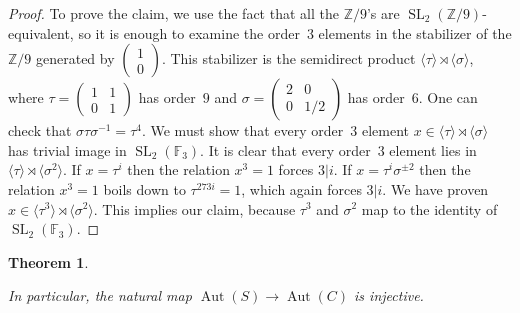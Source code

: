 \documentclass[11pt]{article}
\makeatletter
\newtheorem{theo}{Theorem}[section]
\theoremstyle{definition}
\numberwithin{equation}{section}
\numberwithin{figure}{section}
\numberwithin{table}{section}
\let\save@mathaccent\mathaccent
\newcommand*\if@single[3]{%
  \setbox0\hbox{${\mathaccent"0362{#1}}^H$}%
  \setbox2\hbox{${\mathaccent"0362{\kern0pt#1}}^H$}%
  \ifdim\ht0=\ht2 #3\else #2\fi
  }
\newcommand*\rel@kern[1]{\kern#1\dimexpr\macc@kerna}
\newcommand*\widebar[1]{\@ifnextchar^{{\wide@bar{#1}{0}}}{\wide@bar{#1}{1}}}
\newcommand*\wide@bar[2]{\if@single{#1}{\wide@bar@{#1}{#2}{1}}{\wide@bar@{#1}{#2}{2}}}
\newcommand*\wide@bar@[3]{%
  \begingroup
  \def\mathaccent##1##2{%
    \let\mathaccent\save@mathaccent
    \if#32 \let\macc@nucleus\first@char \fi
    \setbox\z@\hbox{$\macc@style{\macc@nucleus}_{}$}%
    \setbox\tw@\hbox{$\macc@style{\macc@nucleus}{}_{}$}%
    \dimen@\wd\tw@
    \advance\dimen@-\wd\z@
    \divide\dimen@ 3
    \@tempdima\wd\tw@
    \advance\@tempdima-\scriptspace
    \divide\@tempdima 10
    \advance\dimen@-\@tempdima
    \ifdim\dimen@>\z@ \dimen@0pt\fi
    \rel@kern{0.6}\kern-\dimen@
    \if#31
      \overline{\rel@kern{-0.6}\kern\dimen@\macc@nucleus\rel@kern{0.4}\kern\dimen@}%
      \advance\dimen@0.4\dimexpr\macc@kerna
      \let\final@kern#2%
      \ifdim\dimen@<\z@ \let\final@kern1\fi
      \if\final@kern1 \kern-\dimen@\fi
    \else
      \overline{\rel@kern{-0.6}\kern\dimen@#1}%
    \fi
  }%
  \macc@depth\@ne
  \let\math@bgroup\@empty \let\math@egroup\macc@set@skewchar
  \mathsurround\z@ \frozen@everymath{\mathgroup\macc@group\relax}%
  \macc@set@skewchar\relax
  \let\mathaccentV\macc@nested@a
  \if#31
    \macc@nested@a\relax111{#1}%
  \else
    \def\gobble@till@marker##1\endmarker{}%
    \futurelet\first@char\gobble@till@marker#1\endmarker
    \ifcat\noexpand\first@char A\else
      \def\first@char{}%
    \fi
    \macc@nested@a\relax111{\first@char}%
  \fi
  \endgroup
}
\let\oldbar\bar
\renewcommand*{\bar}[1]{\mathchoice{\widebar{#1}}{\widebar{#1}}{\oldbar{#1}}{\oldbar{#1}}}
\newcommand*\gbar{\bar{g}}
\newcommand*\Gbar{\bar{G}}
\newcommand*\Z{\mathbb{Z}}
\newcommand*\F{\mathbb{F}}
\newcommand*\semidirect{\rtimes}
\let\iso\cong
\newcommand*\gend[1]{\langle#1\rangle}
\DeclareMathOperator{\SL}{SL}
\DeclareMathOperator{\PGL}{PGL}
\DeclareMathOperator{\Aut}{Aut}
\newcommand{\calT}{\mathcal{T}}
\newcommand{\frakS}{\mathfrak{S}}
\makeatother
\begin{document}
\begin{proof}
To prove the claim, we use the fact that all the $\Z/9$'s are $\SL_2(\Z/9)$-equivalent, so it is enough to examine the order~$3$ elements in the stabilizer of the $\Z/9$ generated by $(
\begin{smallmatrix}1\\0
\end{smallmatrix})$.
This stabilizer is the semidirect product $\gend{\tau}\semidirect\gend{\sigma}$, where $\tau=(
\begin{smallmatrix}1&1\\0&1
\end{smallmatrix})$ has order~$9$ and
$\sigma=(
\begin{smallmatrix}2&0\\0&1/2
\end{smallmatrix})$ has order~$6$.
One can check that $\sigma\tau\sigma^{-1}=\tau^4$. We must show that every order~$3$ element $x\in\gend{\tau}\semidirect\gend{\sigma}$ has trivial image in $\SL_2(\F_3)$. It is clear that every order~$3$ element lies in $\gend{\tau}\semidirect\gend{\sigma^2}$. If $x=\tau^i$ then the relation $x^3=1$ forces $3|i$. If $x=\tau^i\sigma^{\pm2}$ then the relation $x^3=1$ boils down to $\tau^{273i}=1$, which again forces $3|i$. We have proven $x\in\gend{\tau^3}\semidirect\gend{\sigma^2}$. This implies our claim, because $\tau^3$ and $\sigma^2$ map to the identity of $\SL_2(\F_3)$.
\end{proof}

\begin{theo}\label{thm3.6}
\label{thm-descriptions-of-G}
\leavevmode
{}
In particular, the natural map $\Aut(S)\to\Aut(C)$ is injective.
\end{theo}
\end{document}
